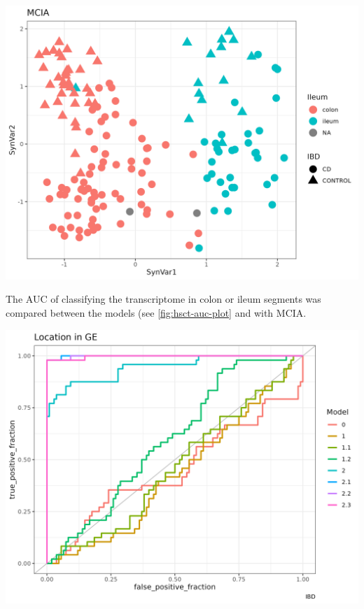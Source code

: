 \documentclass[
  a4paper,
]{book}
\let\origfigure\figure
\let\endorigfigure\endfigure
\renewenvironment{figure}[1][2] {
    \expandafter\origfigure\expandafter[!ht]
} {
    \endorigfigure
}
\begin{document}
\begin{figure}
\includegraphics[width=1\linewidth]{images/hsct-mcia} \caption[MCIA on the HSCT dataset]{MCIA first two synthetic variables on the IBD related cohorts. In red circles the colon and in blue triangles the ileum.}\label{fig:hsct-mcia}
\end{figure}

The AUC of classifying the transcriptome in colon or ileum segments was compared between the models (see \ref{fig:hsct-auc-plot} and with MCIA.

\begin{figure}
\includegraphics[width=1\linewidth]{images/hsct-auc-models} \caption[ROC curves of the RGCCA models on the HSCT dataset.]{ROC curve of the different datasets with the models from RGCCA and the result with MCIA. In gray the MCIA method and with discontinued lines the models of RGCCA.}\label{fig:hsct-auc-plot}
\end{figure}
\end{document}
